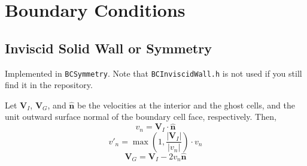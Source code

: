 \section{Boundary Conditions}

\subsection{Inviscid Solid Wall or Symmetry}

Implemented in \texttt{BCSymmetry}. Note that \texttt{BCInviscidWall.h} is not used if you still find it in the repository.

Let $\mathbf{V}_I$, $\mathbf{V}_G$, and $\hat{\mathbf{n}}$ be the velocities at the interior and the ghost cells, and the unit outward surface normal of the boundary cell face, respectively. Then,
\[
v_n = \mathbf{V}_I \cdot \hat{\mathbf{n}}
\]
\[
v'_n = \max \left( 1, \frac{\left|\mathbf{V}_I\right|}{\left|v_n\right|} \right) \cdot v_n
\]
\[
\mathbf{V}_G = \mathbf{V}_I - 2 v_n \hat{\mathbf{n}}
\]


